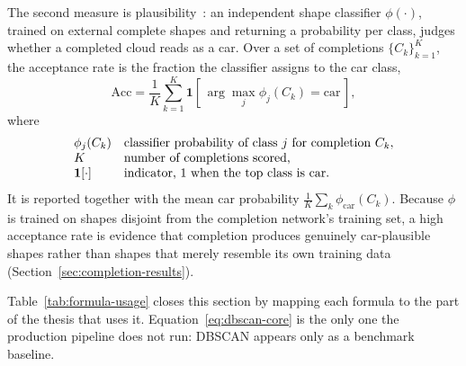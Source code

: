 The second measure is
plausibility~\cite{chen2020unpaired}: an independent shape classifier
$\phi(\cdot)$, trained on external complete shapes and returning a probability per class,
judges whether a completed cloud reads as a car. Over a set of completions
$\{C_k\}_{k=1}^{K}$, the acceptance rate is the fraction the classifier assigns to the car
class,
\begin{equation}
  \mathrm{Acc} = \frac{1}{K}\sum_{k=1}^{K} \mathbf{1}\!\left[\, \arg\max_j \phi_j(C_k) = \mathrm{car} \,\right],
  \label{eq:acceptance}
\end{equation}
where
\[
  \begin{array}{@{}l@{\quad}l@{}}
    \phi_j(C_k) & \text{classifier probability of class } j \text{ for completion } C_k,\\
    K & \text{number of completions scored,}\\
    \mathbf{1}[\cdot] & \text{indicator, 1 when the top class is car.}
  \end{array}
\]
It is reported together with the mean car probability $\tfrac{1}{K}\sum_k \phi_{\mathrm{car}}(C_k)$.
Because $\phi$ is trained on shapes disjoint from the completion network's training set,
a high acceptance rate is evidence that completion produces genuinely car-plausible shapes
rather than shapes that merely resemble its own training data
(Section~\ref{sec:completion-results}).

Table~\ref{tab:formula-usage} closes this section by mapping each formula to the part of the
thesis that uses it. Equation~\eqref{eq:dbscan-core} is the only one the production pipeline
does not run: DBSCAN appears only as a benchmark baseline.

